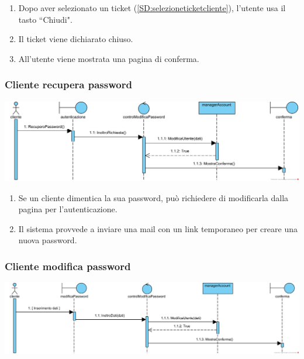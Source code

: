 \documentclass[12pt]{article}
\begin{document}
\begin{enumerate}
\item Dopo aver selezionato un ticket (\ref{SD:selezioneticketcliente}), l'utente usa il tasto ``Chiudi".
\item Il ticket viene dichiarato chiuso.
\item All'utente viene mostrata una pagina di conferma.
\end{enumerate}

\subsubsection{Cliente recupera password}
\label{SD:recuperopw}

\begin{center}
\includegraphics[width=\textwidth]{SequenceDiagram/ClientePasswordRecupero}
\end{center}

\begin{enumerate}
\item Se un cliente dimentica la sua password, può richiedere di modificarla dalla pagina per l'autenticazione.
\item Il sistema provvede a inviare una mail con un link temporaneo per creare una nuova password.
\end{enumerate}

\subsubsection{Cliente modifica password}
\label{SD:modificapw}

\begin{center}
\includegraphics[width=\textwidth]{SequenceDiagram/ClientePasswordModifica}
\end{center}
\end{document}
